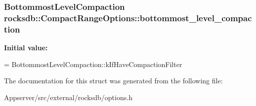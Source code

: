 \subsubsection[{\texorpdfstring{bottommost\+\_\+level\+\_\+compaction}{bottommost\_level\_compaction}}]{\setlength{\rightskip}{0pt plus 5cm}Bottommost\+Level\+Compaction rocksdb\+::\+Compact\+Range\+Options\+::bottommost\+\_\+level\+\_\+compaction}\hypertarget{structrocksdb_1_1CompactRangeOptions_a31b8f4938ce38e4c9c0901d124ed5ee1}{}\label{structrocksdb_1_1CompactRangeOptions_a31b8f4938ce38e4c9c0901d124ed5ee1}
{\bfseries Initial value\+:}
\begin{DoxyCode}
=
      BottommostLevelCompaction::kIfHaveCompactionFilter
\end{DoxyCode}


The documentation for this struct was generated from the following file\+:\begin{DoxyCompactItemize}
\item 
Appserver/src/external/rocksdb/options.\+h\end{DoxyCompactItemize}
